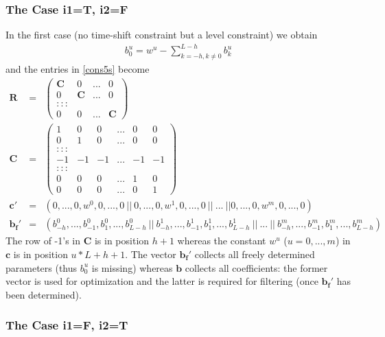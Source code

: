 \documentclass[11pt]{article}
\begin{document}
\subsubsection{The Case i1=T, i2=F}

In the first case (no time-shift constraint but a level constraint) we obtain
\begin{eqnarray*}
b_0^u=w^u-\sum_{k=-h,k\not=0}^{L-h}b_k^u
\end{eqnarray*}
and the entries in \ref{cons5s}  become
\begin{eqnarray}
\mathbf{R}&=&\left(\begin{array}{cccc}
\mathbf{C}&0&...&0\\
0&\mathbf{C}&...&0\\
:::\\
0&0&...&\mathbf{C}
\end{array}\right)\label{app1}\\
\mathbf{C}&=&\left(\begin{array}{cccccc}
1&0&0&...&0&0\\
0&1&0&...&0&0\\
:::\\
-1&-1&-1&...&-1&-1\\
:::\\
0&0&0&...&1&0\\
0&0&0&...&0&1
\end{array}\right)\label{app2}\\
\mathbf{c}'&=&(0,...,0,w^0,0,...,0~||~0,...,0,w^1,0,...,0~||~...~||0,...,0,w^m,0,...,0)\nonumber\\
\mathbf{b_f}'&=&(b_{-h}^0,...,b_{-1}^0,b_1^0,...,b_{L-h}^0~||~b_{-h}^1,...,b_{-1}^1,b_1^1,...,b_{L-h}^1~||~...~||~b_{-h}^m,...,b_{-1}^m,b_1^m,...,b_{L-h}^m)\nonumber
\end{eqnarray}
The row of -1's in $\mathbf{C}$ is in position $h+1$ whereas the constant $w^u$ ($u=0,...,m$) in $\mathbf{c}$ is in position $u*L+h+1$. The vector $\mathbf{b_f'}$ collects all freely determined parameters (thus $b_0^u$ is missing) whereas $\mathbf{b}$ collects all coefficients: the former vector is used for optimization and the latter is required for filtering (once $\mathbf{b_f'}$ has been determined). \\

\subsubsection{The Case i1=F, i2=T}
\end{document}

